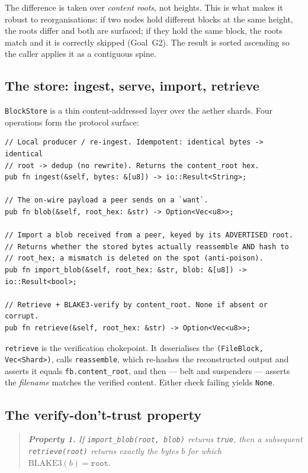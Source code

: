 \documentclass[11pt,a4paper]{article}
\newcommand{\code}[1]{\lstinline[basicstyle=\ttfamily\normalsize\color{codekw}]{#1}}
\begin{document}
\noindent
The difference is taken over \emph{content roots}, not heights. This is what makes
it robust to reorganisations: if two nodes hold different blocks at the same
height, the roots differ and both are surfaced; if they hold the same block, the
roots match and it is correctly skipped (Goal~G2). The result is sorted
ascending so the caller applies it as a contiguous spine.

\subsection{The store: ingest, serve, import, retrieve}

\texttt{BlockStore} is a thin content-addressed layer over the aether shards.
Four operations form the protocol surface:

\begin{lstlisting}
// Local producer / re-ingest. Idempotent: identical bytes -> identical
// root -> dedup (no rewrite). Returns the content_root hex.
pub fn ingest(&self, bytes: &[u8]) -> io::Result<String>;

// The on-wire payload a peer sends on a `want`.
pub fn blob(&self, root_hex: &str) -> Option<Vec<u8>>;

// Import a blob received from a peer, keyed by its ADVERTISED root.
// Returns whether the stored bytes actually reassemble AND hash to
// root_hex; a mismatch is deleted on the spot (anti-poison).
pub fn import_blob(&self, root_hex: &str, blob: &[u8]) -> io::Result<bool>;

// Retrieve + BLAKE3-verify by content_root. None if absent or corrupt.
pub fn retrieve(&self, root_hex: &str) -> Option<Vec<u8>>;
\end{lstlisting}

\noindent
\code{retrieve} is the verification chokepoint. It deserialises the
\texttt{(FileBlock, Vec<Shard>)}, calls \code{reassemble}, which re-hashes the
reconstructed output and asserts it equals \texttt{fb.content\_root}, and then ---
belt and suspenders --- asserts the \emph{filename} matches the verified content.
Either check failing yields \texttt{None}.

\subsection{The verify-don't-trust property}

\begin{quote}\itshape
\textbf{Property 1.} If \code{import_blob(root, blob)} returns \texttt{true},
then a subsequent \code{retrieve(root)} returns exactly the bytes $b$ for which
$\mathrm{BLAKE3}(b) = \texttt{root}$.
\end{quote}
\end{document}

